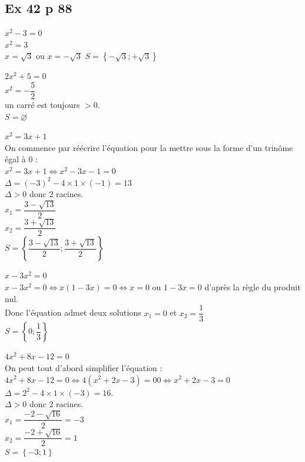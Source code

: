 \documentclass[12pt,a4paper]{book}
\begin{document}
\subsection*{Ex 42 p 88}
\begin{enumMet}
    \item $x^{2}-3=0$\\
    $x^{2}=3$\\
    $x=\sqrt{3}$ ou $x=-\sqrt{3}$
    $S=\left\{-\sqrt{3};+\sqrt{3}\right\}$\\
    \item $2 x^{2}+5=0$\\
    $x^{2}=-\dfrac{5}{2}$\\
    un carré est toujours $>0$.\\
    $S=\varnothing$
    \item $x^{2}=3 x+1$\\
    On commence par réécrire l'équation pour la mettre sous la forme d'un trinôme égal à 0 : \\
    $x^{2}=3 x+1 \Leftrightarrow x^{2}-3 x-1=0$\\
    $\Delta=(-3)^{2}-4 \times 1 \times(-1)=13$\\
    $\Delta>0$ donc 2 racines.\\
    $x_{1}=\dfrac{3-\sqrt{13}}{2}$\\
    $x_{2}=\dfrac{3+\sqrt{13}}{2}$\\
    $S=\left\{\dfrac{3-\sqrt{13}}{2};\dfrac{3+\sqrt{13}}{2}\right\}$
    \item $x-3 x^{2}=0$\\
    $x-3 x^{2}=0 \Leftrightarrow x(1-3 x)=0 \Leftrightarrow x=0$ ou $1-3 x=0$ d'après la règle du produit nul.\\
    Donc l'équation admet deux solutions $x_{1}=0$ et $x_{2}=\dfrac{1}{3}$\\
    $S=\left\{0;\dfrac{1}{3}\right\}$
    \item $4 x^{2}+8 x-12=0$\\
    On peut tout d'abord simplifier l'équation :\\
    $4 x^{2}+8 x-12=0 \Leftrightarrow 4\left(x^{2}+2 x-3\right)=00 \Leftrightarrow x^{2}+2 x-3=0$\\
    $\Delta=2^{2}-4 \times 1 \times(-3)=16$.\\
    $\Delta>0$ donc 2 racines.\\
    $x_{1}=\dfrac{-2-\sqrt{16}}{2}=-3$\\
    $x_{2}=\dfrac{-2+\sqrt{16}}{2}=1$\\
    $S=\left\{-3;1\right\}$

\end{enumMet}
\end{document}

